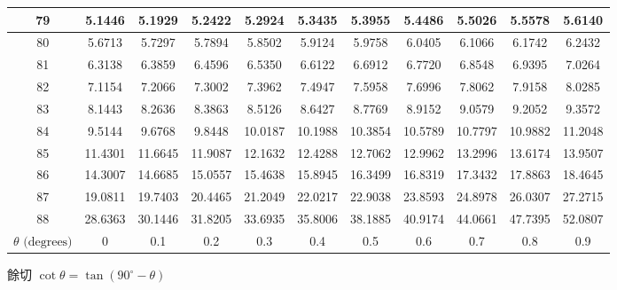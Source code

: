 {\begin{tabular}{|c|cccccccccc|}
79 & 5.1446 & 5.1929 & 5.2422 & 5.2924 & 5.3435 & 5.3955 & 5.4486 & 5.5026 & 5.5578 & 5.6140 \\
\hline
80 & 5.6713 & 5.7297 & 5.7894 & 5.8502 & 5.9124 & 5.9758 & 6.0405 & 6.1066 & 6.1742 & 6.2432 \\
81 & 6.3138 & 6.3859 & 6.4596 & 6.5350 & 6.6122 & 6.6912 & 6.7720 & 6.8548 & 6.9395 & 7.0264 \\
82 & 7.1154 & 7.2066 & 7.3002 & 7.3962 & 7.4947 & 7.5958 & 7.6996 & 7.8062 & 7.9158 & 8.0285 \\
83 & 8.1443 & 8.2636 & 8.3863 & 8.5126 & 8.6427 & 8.7769 & 8.9152 & 9.0579 & 9.2052 & 9.3572 \\
84 & 9.5144 & 9.6768 & 9.8448 & 10.0187 & 10.1988 & 10.3854 & 10.5789 & 10.7797 & 10.9882 & 11.2048 \\
\hline
85 & 11.4301 & 11.6645 & 11.9087 & 12.1632 & 12.4288 & 12.7062 & 12.9962 & 13.2996 & 13.6174 & 13.9507 \\
86 & 14.3007 & 14.6685 & 15.0557 & 15.4638 & 15.8945 & 16.3499 & 16.8319 & 17.3432 & 17.8863 & 18.4645 \\
87 & 19.0811 & 19.7403 & 20.4465 & 21.2049 & 22.0217 & 22.9038 & 23.8593 & 24.8978 & 26.0307 & 27.2715 \\
88 & 28.6363 & 30.1446 & 31.8205 & 33.6935 & 35.8006 & 38.1885 & 40.9174 & 44.0661 & 47.7395 & 52.0807 \\
\hline
$\theta\text{ (degrees)}$ & 0 & 0.1 & 0.2 & 0.3 & 0.4 & 0.5 & 0.6 & 0.7 & 0.8 & 0.9 \\ \hline
\end{tabular}\par}
\vspace{0.5em}\begin{center}\small 餘切 $\cot\theta = \tan(90^\circ - \theta)$\end{center}
\clearpage

